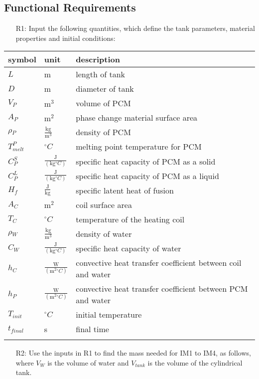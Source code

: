 \documentclass[12pt]{article}
\begin{document}
\subsection{Functional Requirements}
\label{Sec:FR}
\begin{itemize}
\item[R1:]Input the following quantities, which define the tank parameters, material properties and initial conditions:
\end{itemize}
\begin{longtable*}{l l l}
\toprule
symbol & unit & description
\\
\midrule
$L$ & m & length of tank
\\
$D$ & m & diameter of tank
\\
$V_{P}$ & $\text{m}^{3}$ & volume of PCM
\\
$A_{P}$ & $\text{m}^{2}$ & phase change material surface area
\\
$\rho{}_{P}$ & $\frac{\text{kg}}{\text{m}^{3}}$ & density of PCM
\\
$T_{melt}^{P}$ & ${}^{\circ}C$ & melting point temperature for PCM
\\
$C_{P}^{S}$ & $\frac{\text{J}}{(\text{kg}{}^{\circ}C)}$ & specific heat capacity of PCM as a solid
\\
$C_{P}^{L}$ & $\frac{\text{J}}{(\text{kg}{}^{\circ}C)}$ & specific heat capacity of PCM as a liquid
\\
$H_{f}$ & $\frac{\text{J}}{\text{kg}}$ & specific latent heat of fusion
\\
$A_{C}$ & $\text{m}^{2}$ & coil surface area
\\
$T_{C}$ & ${}^{\circ}C$ & temperature of the heating coil
\\
$\rho{}_{W}$ & $\frac{\text{kg}}{\text{m}^{3}}$ & density of water
\\
$C_{W}$ & $\frac{\text{J}}{(\text{kg}{}^{\circ}C)}$ & specific heat capacity of water
\\
$h_{C}$ & $\frac{\text{W}}{(\text{m}^{2}{}^{\circ}C)}$ & convective heat transfer coefficient between coil and water
\\
$h_{P}$ & $\frac{\text{W}}{(\text{m}^{2}{}^{\circ}C)}$ & convective heat transfer coefficient between PCM and water
\\
$T_{init}$ & ${}^{\circ}C$ & initial temperature
\\
$t_{final}$ & s & final time
\\
\bottomrule
\label{Table:IVR}
\end{longtable*}
\begin{itemize}
\item[R2:]Use the inputs in R1 to find the mass needed for IM1 to IM4, as follows, where $V_{W}$ is the volume of water and $V_{tank}$ is the volume of the cylindrical tank.
\end{itemize}
\end{document}
